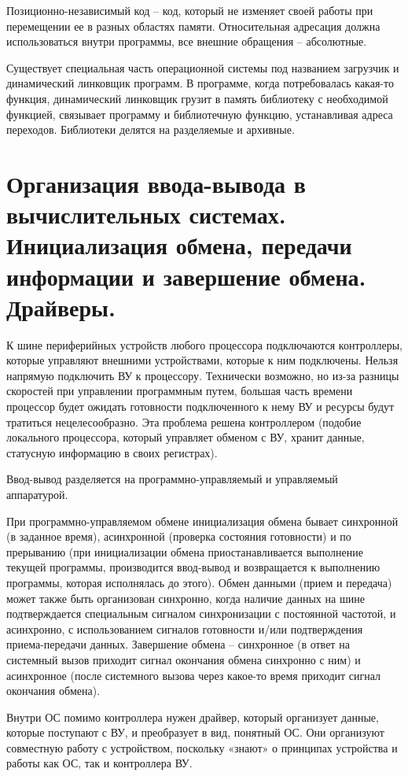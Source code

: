 \documentclass{article}
\begin{document}
Позиционно-независимый код – код, который не изменяет своей работы при перемещении ее в разных областях памяти. 
Относительная адресация должна использоваться внутри программы, все внешние обращения – абсолютные.


Существует специальная часть операционной системы под названием загрузчик и динамический линковщик программ. 
В программе, когда потребовалась какая-то функция, динамический линковщик грузит в память библиотеку с необходимой функцией, 
связывает программу и библиотечную функцию, устанавливая адреса переходов. 
Библиотеки делятся на разделяемые  и архивные.





\section{Организация ввода-вывода в вычислительных системах. Инициализация обмена, передачи информации и завершение обмена. Драйверы.}
К шине периферийных устройств любого процессора подключаются контроллеры, которые управляют внешними устройствами, которые к ним подключены. 
Нельзя напрямую подключить ВУ к процессору. Технически возможно, но из-за разницы скоростей при управлении программным путем, большая часть времени процессор будет ожидать готовности подключенного к нему ВУ и ресурсы будут тратиться нецелесообразно. 
Эта проблема решена контроллером (подобие локального процессора, который управляет обменом с ВУ, хранит данные, статусную информацию в своих регистрах).


Ввод-вывод разделяется на программно-управляемый и управляемый аппаратурой.


При программно-управляемом обмене инициализация обмена бывает синхронной (в заданное время), асинхронной (проверка состояния готовности) и по прерыванию (при инициализации обмена приостанавливается выполнение текущей программы, производится ввод-вывод и возвращается к выполнению программы, которая исполнялась до этого). Обмен данными (прием и передача) может также быть организован синхронно, когда наличие данных на шине подтверждается специальным сигналом синхронизации с постоянной частотой, и асинхронно, с использованием сигналов готовности и/или подтверждения приема-передачи данных. Завершение обмена – синхронное (в ответ на системный вызов приходит сигнал окончания обмена синхронно с ним) и асинхронное (после системного вызова через какое-то время приходит сигнал окончания обмена).  


Внутри ОС помимо контроллера нужен драйвер, который организует данные, которые поступают с ВУ, и преобразует в вид, понятный ОС.  Они организуют совместную работу с устройством, поскольку «знают» о принципах устройства и работы как ОС, так и контроллера ВУ.
\end{document}
